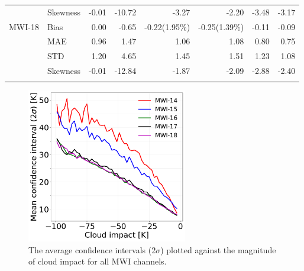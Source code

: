 \documentclass[amt, manuscript]{copernicus}
\begin{document}
\begin{table}[t]
\begin{tabular}{llrr|rr|rr}
					&Skewness & -0.01 & -10.72 & -3.27 & -2.20 & -3.48 & -3.17 \\
		\middlehline			
		MWI-18 		&Bias     &  0.00 &  -0.65 & -0.22(1.95\%) & -0.25(1.39\%) & -0.11 & -0.09 \\
					&MAE      &  0.96 &   1.47 &  1.06 &  1.08 &  0.80 &  0.75 \\
					&STD      &  1.20 &   4.65 &  1.45 &  1.51 &  1.23 &  1.08 \\
					&Skewness & -0.01 & -12.84 & -1.87 & -2.09 & -2.88 & -2.40 	\\
		\bottomhline				
	\end{tabular}	
	\belowtable{} %
\end{table}
\begin{figure}[t]
	\includegraphics[width = 70mm]{Figures/cloud_impact_uncertainty_MWI.pdf}	
	\caption{The average confidence intervals (2$\sigma$) plotted against the magnitude of cloud impact for all MWI channels.}
	\label{fig:uncertainty_cloud_impact}	
\end{figure}
\end{document}
